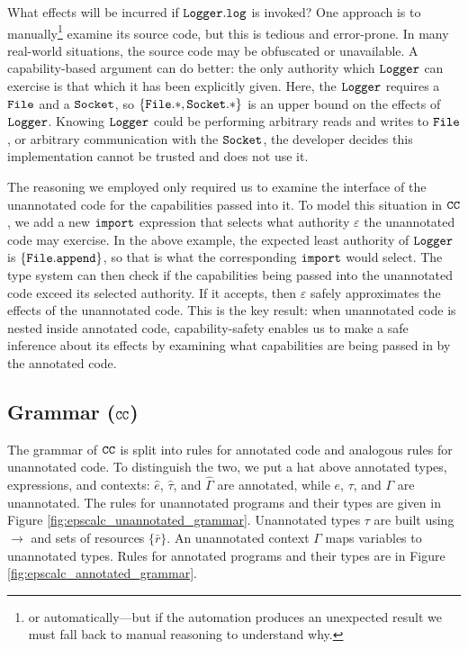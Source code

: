 What effects will be incurred if $\mathtt{Logger.log}$ is invoked? One
approach is to manually\footnote{or automatically---but if the
  automation produces an unexpected result we must fall back to manual
  reasoning to understand why.} examine its source code, but this is
tedious and error-prone. In many real-world situations, the source
code may be obfuscated or unavailable. A capability-based argument can
do better: the only authority which $\mathtt{Logger}$ can exercise is
that which it has been explicitly given. Here, the $\mathtt{Logger}$
requires a $\mathtt{File}$ and a $\mathtt{Socket}$, so
$\mathtt{ \{ \mathtt{File.*, Socket.*} \} }$ is an upper bound on the
effects of $\mathtt{Logger}$. Knowing $\mathtt{Logger}$ could be performing
arbitrary reads and writes to $\mathtt{File}$, or arbitrary communication
with the $\mathtt{Socket}$, the developer decides this implementation
cannot be trusted and does not use it.

The reasoning we employed only required us to examine the interface of
the unannotated code for the capabilities passed into it. To model
this situation in $\mathtt{CC}$, we add a new $\mathtt{import}$ expression
that selects what authority $\varepsilon$ the unannotated code may
exercise. In the above example, the expected least authority of
$\mathtt{Logger}$ is $\{ \mathtt{File.append} \}$, so that is what the
corresponding $\mathtt{import}$ would select. The type system can then
check if the capabilities being passed into the unannotated code
exceed its selected authority. If it accepts, then $\varepsilon$
safely approximates the effects of the unannotated code. This is the
key result: when unannotated code is nested inside annotated code,
capability-safety enables us to make a safe inference about its
effects by examining what capabilities are being passed in by the
annotated code.

\vspace{-0.5cm}
\subsection{Grammar ($\mathtt{CC}$)}
\vspace{-0.2cm}

The grammar of $\mathtt{CC}$ is split into rules for annotated code and
analogous rules for unannotated code. To distinguish the two, we put a
hat above annotated types, expressions, and contexts: $\hat e$,
$\hat \tau$, and $\hat \Gamma$ are annotated, while $e$, $\tau$, and
$\Gamma$ are unannotated. The rules for unannotated programs and their
types are given in Figure
\ref{fig:epscalc_unannotated_grammar}. Unannotated types $\tau$ are
built using $\rightarrow$ and sets of resources $\{ \bar r \}$. An
unannotated context $\Gamma$ maps variables to unannotated
types. Rules for annotated programs and their types are in
Figure \ref{fig:epscalc_annotated_grammar}.


